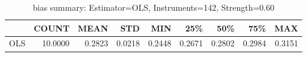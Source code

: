 \begin{table}[ht]
\centering
\caption{bias summary: Estimator=OLS, Instruments=142, Strength=0.60}
\begin{tabular}{lrrrrrrrr}
\toprule
 & COUNT & MEAN & STD & MIN & 25\% & 50\% & 75\% & MAX \\
\midrule
OLS & 10.0000 & 0.2823 & 0.0218 & 0.2448 & 0.2671 & 0.2802 & 0.2984 & 0.3151 \\
\bottomrule
\end{tabular}
\end{table}
